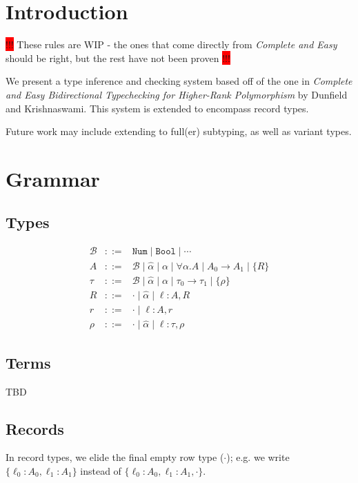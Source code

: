 \documentclass{article}
\newcommand{\consider}[1]{\colorbox{red}{!!!} #1 \colorbox{red}{!!!}}
\newcommand{\B}{\mathcal{B}}
\newcommand{\bottom}{\perp}
\newcommand{\define}{::=}
\newcommand{\ev}{\hat}
\begin{document}
\section{Introduction}
\consider{These rules are WIP - the ones that come directly from
  \textit{Complete and Easy} should be right, but the rest have not been proven}

We present a type inference and checking system based off of the one in
\textit{Complete and Easy Bidirectional Typechecking for Higher-Rank
  Polymorphism} by Dunfield and Krishnaswami. This system is extended to
encompass record types.

Future work may include extending to full(er) subtyping, as well as variant
types.

\section{Grammar}

\subsection{Types}
\[\begin{array}{rcl}
\B & \define & \texttt{Num} \mid \texttt{Bool} \mid \cdots
\\
A & \define & \B \mid \ev\alpha \mid \alpha \mid \forall \alpha. A \mid A_0 \to A_1 \mid \{R\}
\\
\tau & \define & \B \mid \ev\alpha \mid \alpha \mid \tau_0 \to \tau_1 \mid \{\rho\}
\\
R & \define & \cdot \mid \ev\alpha \mid \ell : A, R
\\
r & \define & \cdot \mid \ell : A, r
\\
\rho & \define & \cdot \mid \ev\alpha \mid \ell : \tau, \rho
\end{array}
\]

\subsection{Terms}
TBD

\subsection{Records}
In record types, we elide the final empty row type
($\cdot$); e.g. we write $\{\ell_0 : A_0, \ell_1 : A_1\}$ instead of $\{\ell_0 : A_0, \ell_1 : A_1, \cdot\}$.
\end{document}
